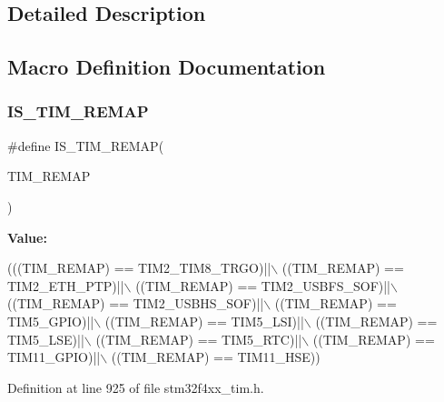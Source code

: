 \subsection{Detailed Description}


\subsection{Macro Definition Documentation}
\mbox{\label{group___t_i_m___remap_ga7faab73212e996d8b49555d3ad5be965}} 
\subsubsection{\texorpdfstring{I\+S\+\_\+\+T\+I\+M\+\_\+\+R\+E\+M\+AP}{IS\_TIM\_REMAP}}
{\footnotesize\ttfamily \#define I\+S\+\_\+\+T\+I\+M\+\_\+\+R\+E\+M\+AP(\begin{DoxyParamCaption}\item[{}]{T\+I\+M\+\_\+\+R\+E\+M\+AP }\end{DoxyParamCaption})}

{\bfseries Value\+:}
\begin{DoxyCode}
(((TIM\_REMAP) == TIM2\_TIM8\_TRGO)||\(\backslash\)
                                  ((TIM\_REMAP) == TIM2\_ETH\_PTP)||\(\backslash\)
                                  ((TIM\_REMAP) == TIM2\_USBFS\_SOF)||\(\backslash\)
                                  ((TIM\_REMAP) == TIM2\_USBHS\_SOF)||\(\backslash\)
                                  ((TIM\_REMAP) == TIM5\_GPIO)||\(\backslash\)
                                  ((TIM\_REMAP) == TIM5\_LSI)||\(\backslash\)
                                  ((TIM\_REMAP) == TIM5\_LSE)||\(\backslash\)
                                  ((TIM\_REMAP) == TIM5\_RTC)||\(\backslash\)
                                  ((TIM\_REMAP) == TIM11\_GPIO)||\(\backslash\)
                                  ((TIM\_REMAP) == TIM11\_HSE))
\end{DoxyCode}


Definition at line 925 of file stm32f4xx\+\_\+tim.\+h.

